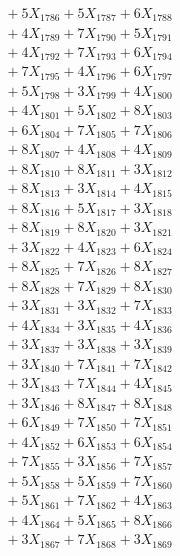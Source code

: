 \documentclass[a4paper,10pt]{article}
\begin{document}
{\begin{align}
&\;  + 5 X_{1786} + 5 X_{1787} + 6 X_{1788} \\[0.3ex]
&\;  + 4 X_{1789} + 7 X_{1790} + 5 X_{1791} \\[0.3ex]
&\;  + 4 X_{1792} + 7 X_{1793} + 6 X_{1794} \\[0.3ex]
&\;  + 7 X_{1795} + 4 X_{1796} + 6 X_{1797} \\[0.3ex]
&\;  + 5 X_{1798} + 3 X_{1799} + 4 X_{1800} \\[0.3ex]
&\;  + 4 X_{1801} + 5 X_{1802} + 8 X_{1803} \\[0.3ex]
&\;  + 6 X_{1804} + 7 X_{1805} + 7 X_{1806} \\[0.3ex]
&\;  + 8 X_{1807} + 4 X_{1808} + 4 X_{1809} \\[0.5ex]\allowbreak
&\;  + 8 X_{1810} + 8 X_{1811} + 3 X_{1812} \\[0.3ex]
&\;  + 8 X_{1813} + 3 X_{1814} + 4 X_{1815} \\[0.3ex]
&\;  + 8 X_{1816} + 5 X_{1817} + 3 X_{1818} \\[0.3ex]
&\;  + 8 X_{1819} + 8 X_{1820} + 3 X_{1821} \\[0.3ex]
&\;  + 3 X_{1822} + 4 X_{1823} + 6 X_{1824} \\[0.3ex]
&\;  + 8 X_{1825} + 7 X_{1826} + 8 X_{1827} \\[0.3ex]
&\;  + 8 X_{1828} + 7 X_{1829} + 8 X_{1830} \\[0.3ex]
&\;  + 3 X_{1831} + 3 X_{1832} + 7 X_{1833} \\[0.3ex]
&\;  + 4 X_{1834} + 3 X_{1835} + 4 X_{1836} \\[0.3ex]
&\;  + 3 X_{1837} + 3 X_{1838} + 3 X_{1839} \\[0.5ex]\allowbreak
&\;  + 3 X_{1840} + 7 X_{1841} + 7 X_{1842} \\[0.3ex]
&\;  + 3 X_{1843} + 7 X_{1844} + 4 X_{1845} \\[0.3ex]
&\;  + 3 X_{1846} + 8 X_{1847} + 8 X_{1848} \\[0.3ex]
&\;  + 6 X_{1849} + 7 X_{1850} + 7 X_{1851} \\[0.3ex]
&\;  + 4 X_{1852} + 6 X_{1853} + 6 X_{1854} \\[0.3ex]
&\;  + 7 X_{1855} + 3 X_{1856} + 7 X_{1857} \\[0.3ex]
&\;  + 5 X_{1858} + 5 X_{1859} + 7 X_{1860} \\[0.3ex]
&\;  + 5 X_{1861} + 7 X_{1862} + 4 X_{1863} \\[0.3ex]
&\;  + 4 X_{1864} + 5 X_{1865} + 8 X_{1866} \\[0.3ex]
&\;  + 3 X_{1867} + 7 X_{1868} + 3 X_{1869} \\[0.5ex]\allowbreak

\end{align}}
\end{document}
